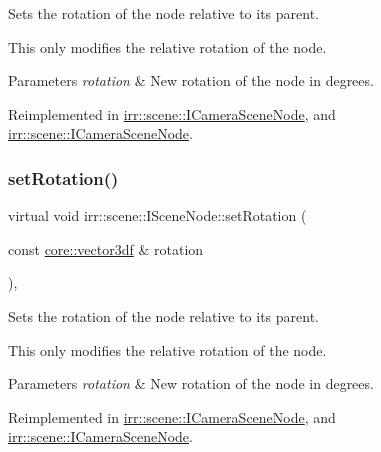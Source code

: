 Sets the rotation of the node relative to its parent. 

This only modifies the relative rotation of the node. 
\begin{DoxyParams}{Parameters}
{\em rotation} & New rotation of the node in degrees. \\
\hline
\end{DoxyParams}


Reimplemented in \hyperlink{classirr_1_1scene_1_1ICameraSceneNode_af95d5f50c192f212e11f3f050e92a470}{irr\+::scene\+::\+I\+Camera\+Scene\+Node}, and \hyperlink{classirr_1_1scene_1_1ICameraSceneNode_af95d5f50c192f212e11f3f050e92a470}{irr\+::scene\+::\+I\+Camera\+Scene\+Node}.

\mbox{\label{classirr_1_1scene_1_1ISceneNode_adb6ff54f52d3a9e1514cd487a550935c}} 
\subsubsection{\texorpdfstring{set\+Rotation()}{setRotation()}\hspace{0.1cm}{\footnotesize\ttfamily [2/2]}}
{\footnotesize\ttfamily virtual void irr\+::scene\+::\+I\+Scene\+Node\+::set\+Rotation (\begin{DoxyParamCaption}\item[{const \hyperlink{namespaceirr_1_1core_ae6e2b2a6c552833ebbd5b7463d03586b}{core\+::vector3df} \&}]{rotation }\end{DoxyParamCaption})\hspace{0.3cm}{\ttfamily [inline]}, {\ttfamily [virtual]}}



Sets the rotation of the node relative to its parent. 

This only modifies the relative rotation of the node. 
\begin{DoxyParams}{Parameters}
{\em rotation} & New rotation of the node in degrees. \\
\hline
\end{DoxyParams}


Reimplemented in \hyperlink{classirr_1_1scene_1_1ICameraSceneNode_af95d5f50c192f212e11f3f050e92a470}{irr\+::scene\+::\+I\+Camera\+Scene\+Node}, and \hyperlink{classirr_1_1scene_1_1ICameraSceneNode_af95d5f50c192f212e11f3f050e92a470}{irr\+::scene\+::\+I\+Camera\+Scene\+Node}.

